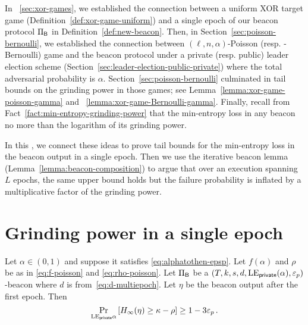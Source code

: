 
In \Section~\ref{sec:xor-games}, 
we established the connection between 
a uniform XOR target game 
(Definition~\ref{def:xor-game-uniform})
and a single epoch of our beacon protocol $\Pi_{\mathsf{B}}$ 
in Definition~\ref{def:new-beacon}.
Then, in Section~\ref{sec:poisson-bernoulli}, 
we established the connection between 
$(\ell,n,\alpha)$-Poisson (resp. -Bernoulli) game 
and the beacon protocol 
under a private (resp. public) leader election scheme 
(Section~\ref{sec:leader-election-public-private})
where the total adversarial probability is $\alpha$. 
Section~\ref{sec:poisson-bernoulli} 
culminated in tail bounds 
on the grinding power in those games; 
see Lemma~\ref{lemma:xor-game-poisson-gamma} and ~\ref{lemma:xor-game-Bernoulli-gamma}. 
Finally, recall from Fact~\ref{fact:min-entropy-grinding-power} 
that the min-entropy loss in any beacon no more than the logarithm of its grinding power. 

In this \Section, we connect these ideas
to prove tail bounds for the min-entropy loss in the beacon output in a single epoch. 
Then we use the iterative beacon lemma (Lemma~\ref{lemma:beacon-composition}) 
to argue that over an execution spanning $L$ epochs, 
the same upper bound holds but the failure probability is inflated by 
a multiplicative factor of the grinding power.



\section{Grinding power in a single epoch}



\begin{lemma}\label{lemma:beacon-poisson-single-epoch}
  Let $\alpha \in (0, 1)$ and suppose it satisfies \eqref{eq:alphatothen-epsp}.
  Let $f(\alpha)$ and $\rho$ be as in \eqref{eq:f-poisson} and \eqref{eq:rho-poisson}.
  Let $\Pi_{\mathsf{B}}$ be a $(T,k,s,d,\mathrm{LE}_\mathsf{private}(\alpha), \mathsf{\varepsilon}_p)$-beacon 
  where $d$ is from~\eqref{eq:d-multiepoch}.
  Let $\eta$ be the beacon output after the first epoch. 
  Then 
  \begin{equation}\label{eq:security-poisson-single-epoch}
    \Pr_{\mathrm{LE}_\mathsf{private}{\alpha}}\left[H_\infty(\eta) \geq \kappa - \rho \right] \geq 1 - 3 \mathsf{\varepsilon}_p
    \,.
  \end{equation}
\end{lemma}

